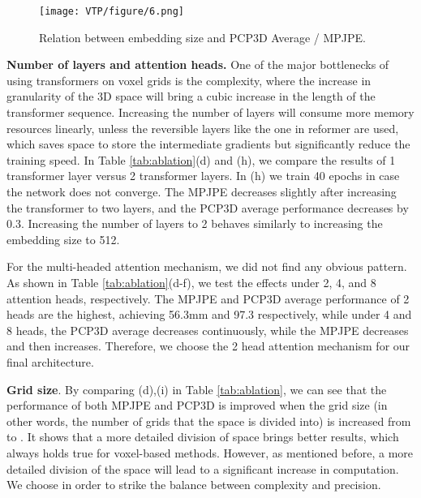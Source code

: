 \documentclass[lettersize,journal]{IEEEtran}
\begin{document}
\begin{figure}[htp]
  \texttt{[image: VTP/figure/6.png]}
  \caption{Relation between embedding size and PCP3D Average / MPJPE.}
  \label{fig:embedding}
\end{figure}

\par \textbf{Number of layers and attention heads.} One of the major bottlenecks of using transformers on voxel grids is the complexity, where the increase in granularity of the 3D space will bring a cubic increase in the length of the transformer sequence. Increasing the number of layers will consume more memory resources linearly, unless the reversible layers like the one in reformer\cite{kitaev2020reformer} are used, which saves space to store the intermediate gradients but significantly reduce the training speed. In Table \ref{tab:ablation}(d) and (h), we compare the results of 1 transformer layer versus 2 transformer layers. In (h) we train 40 epochs in case the network does not converge. The MPJPE decreases slightly after increasing the transformer to two layers, and the PCP3D average performance decreases by 0.3. Increasing the number of layers to 2 behaves similarly to increasing the embedding size to 512.

\par For the multi-headed attention mechanism, we did not find any obvious pattern. As shown in Table \ref{tab:ablation}(d-f), we test the effects under 2, 4, and 8 attention heads, respectively. The MPJPE and PCP3D average performance of 2 heads are the highest, achieving 56.3mm and 97.3 respectively, while under 4 and 8 heads, the PCP3D average decreases continuously, while the MPJPE decreases and then increases. Therefore, we choose the 2 head attention mechanism for our final architecture.

\par \textbf{Grid size}. By comparing (d),(i) in Table \ref{tab:ablation},  we can see that the performance of both MPJPE and PCP3D is improved when the grid size (in other words, the number of grids that the space is divided into) is increased from  to . It shows that a more detailed division of space brings better results, which always holds true for voxel-based methods. However, as mentioned before, a more detailed division of the space will lead to a significant increase in computation. We choose  in order to strike the balance between complexity and precision.
\end{document}

